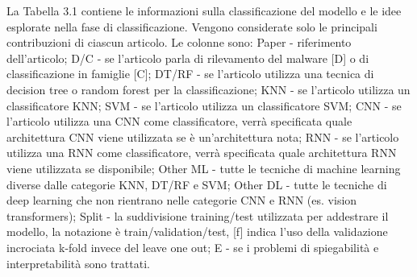 La Tabella 3.1 contiene le informazioni sulla classificazione del modello e le idee esplorate nella fase di classificazione. Vengono considerate solo le principali contribuzioni di ciascun articolo. Le colonne sono: Paper - riferimento dell'articolo; D/C - se l'articolo parla di rilevamento del malware [D] o di classificazione in famiglie [C]; DT/RF - se l'articolo utilizza una tecnica di decision tree o random forest per la classificazione; KNN - se l'articolo utilizza un classificatore KNN; SVM - se l'articolo utilizza un classificatore SVM; CNN - se l'articolo utilizza una CNN come classificatore, verrà specificata quale architettura CNN viene utilizzata se è un'architettura nota; RNN - se l'articolo utilizza una RNN come classificatore, verrà specificata quale architettura RNN viene utilizzata se disponibile; Other ML - tutte le tecniche di machine learning diverse dalle categorie KNN, DT/RF e SVM; Other DL - tutte le tecniche di deep learning che non rientrano nelle categorie CNN e RNN (es. vision transformers); Split - la suddivisione training/test utilizzata per addestrare il modello, la notazione è train/validation/test, [f] indica l'uso della validazione incrociata k-fold invece del leave one out; E - se i problemi di spiegabilità e interpretabilità sono trattati.

